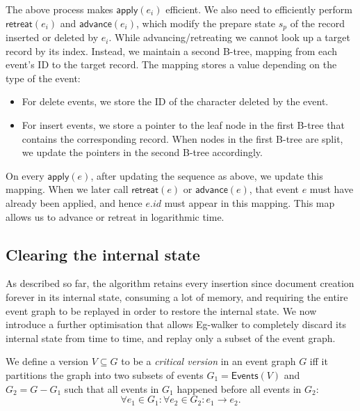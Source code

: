 \documentclass[sigplan,10pt]{acmart}
\newcommand{\algname}{Eg-walker\xspace}
\begin{document}
The above process makes $\mathsf{apply}(e_i)$ efficient.
We also need to efficiently perform $\mathsf{retreat}(e_i)$ and $\mathsf{advance}(e_i)$, which modify the prepare state $s_p$ of the record inserted or deleted by $e_i$.
While advancing/retreating we cannot look up a target record by its index. Instead, we maintain a second B-tree, mapping from each event's ID to the target record. The mapping stores a value depending on the type of the event:

\begin{itemize}
\item For delete events, we store the ID of the character deleted by the event.
\item For insert events, we store a pointer to the leaf node in the first B-tree that contains the corresponding record. When nodes in the first B-tree are split, we update the pointers in the second B-tree accordingly.
\end{itemize}

On every $\mathsf{apply}(e)$, after updating the sequence as above, we update this mapping.
When we later call $\mathsf{retreat}(e)$ or $\mathsf{advance}(e)$, that event $e$ must have already been applied, and hence $e.\mathit{id}$ must appear in this mapping.
This map allows us to advance or retreat in logarithmic time.

\subsection{Clearing the internal state}\label{clearing}

As described so far, the algorithm retains every insertion since document creation forever in its internal state, consuming a lot of memory, and requiring the entire event graph to be replayed in order to restore the internal state.
We now introduce a further optimisation that allows \algname to completely discard its internal state from time to time, and replay only a subset of the event graph.

We define a version $V \subseteq G$ to be a \emph{critical version} in an event graph $G$ iff it partitions the graph into two subsets of events $G_1 = \mathsf{Events}(V)$ and $G_2 = G - G_1$ such that all events in $G_1$ happened before all events in $G_2$:
\begin{equation*}
  \forall e_1 \in G_1: \forall e_2 \in G_2: e_1 \rightarrow e_2.
\end{equation*}
\end{document}
